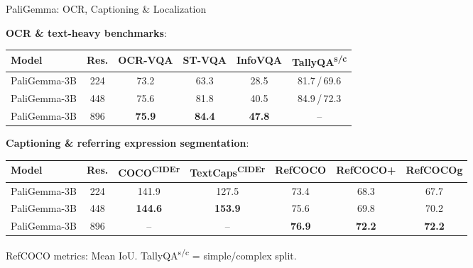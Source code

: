 \begin{frame}{PaliGemma: OCR, Captioning \& Localization}

  \vspace{-0.3em}
  \textbf{OCR \& text-heavy benchmarks}:
  \vspace{0.2em}

  \begin{center}
  \small
  \begin{tabular}{l c | c c c c}
    \toprule
    \textbf{Model} & \textbf{Res.} & \textbf{OCR-VQA} & \textbf{ST-VQA} & \textbf{InfoVQA} & \textbf{TallyQA\textsuperscript{s/c}} \\
    \midrule
    PaliGemma-3B     & 224  & 73.2  & 63.3  & 28.5   & 81.7\,/\,69.6 \\
    PaliGemma-3B     & 448  & 75.6  & 81.8  & 40.5   & 84.9\,/\,72.3 \\
    PaliGemma-3B     & 896  & \textbf{75.9}  & \textbf{84.4}  & \textbf{47.8}   & -- \\
    \bottomrule
  \end{tabular}
  \end{center}

  \vspace{0.3em}
  \textbf{Captioning \& referring expression segmentation}:
  \vspace{0.2em}

  \begin{center}
  \small
  \begin{tabular}{l c | c c | c c c}
    \toprule
    \textbf{Model} & \textbf{Res.} & \textbf{COCO\textsuperscript{CIDEr}} & \textbf{TextCaps\textsuperscript{CIDEr}} & \textbf{RefCOCO} & \textbf{RefCOCO+} & \textbf{RefCOCOg} \\
    \midrule
    PaliGemma-3B & 224 & 141.9  & 127.5  & 73.4  & 68.3  & 67.7 \\
    PaliGemma-3B & 448 & \textbf{144.6}  & \textbf{153.9}  & 75.6  & 69.8  & 70.2 \\
    PaliGemma-3B & 896 & --     & --     & \textbf{76.9}  & \textbf{72.2}  & \textbf{72.2} \\
    \bottomrule
  \end{tabular}
  \end{center}

  \vspace{0.2em}
  {\scriptsize RefCOCO metrics: Mean IoU. TallyQA\textsuperscript{s/c} = simple/complex split.}


\end{frame}
